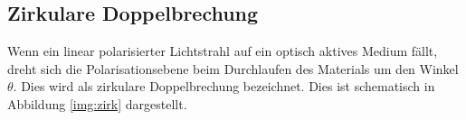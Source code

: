 \subsection{Zirkulare Doppelbrechung}

\noindent Wenn ein linear polarisierter Lichtstrahl auf ein optisch aktives Medium fällt, dreht sich die Polarisationsebene beim Durchlaufen des Materials um den Winkel $\theta$.
Dies wird als zirkulare Doppelbrechung bezeichnet. Dies ist schematisch in Abbildung \ref{img:zirk} dargestellt.


